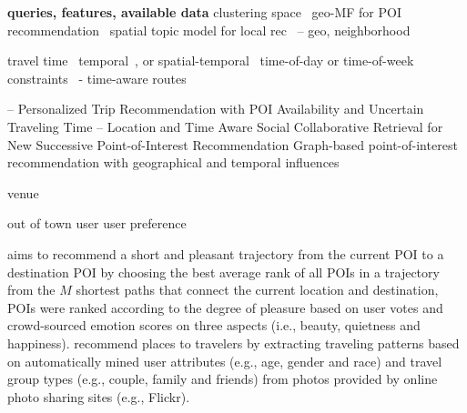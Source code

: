 

{\bf queries, features, available data}
clustering space~\cite{hu2013spatialtopic}
geo-MF for POI recommendation~\cite{lian2014geomf}
spatial topic model for local rec~\cite{hu2013spatialtopic}
\cite{liu2014exploiting} -- geo, neighborhood

travel time~\cite{gao2013temporal}
temporal~\cite{yuan2013timeaware,hsieh2014mining,gao2013temporal}, or spatial-temporal~\cite{yuan2014graph}
time-of-day or time-of-week constraints~\cite{chen2015tripplanner}
\cite{hsieh2014mining} - time-aware routes

\cite{zhang2015personalized} -- Personalized Trip Recommendation with POI Availability and Uncertain Traveling Time
\cite{zhang2015location} -- Location and Time Aware Social Collaborative Retrieval for New Successive Point-of-Interest Recommendation
\cite{yuan2014graph} Graph-based point-of-interest recommendation with geographical and temporal influences

venue\cite{deveaud2014importance,deveaud2015experiments}

out of town user \cite{ference2013location}
user preference\cite{liu2013personalized}

\cite{ht14} aims to recommend a short and pleasant trajectory from the current POI to a destination POI by choosing the best average rank 
of all POIs in a trajectory from the $M$ shortest paths that connect the current location and destination,
POIs were ranked according to the degree of pleasure based on user votes and  crowd-sourced emotion scores on three aspects 
(i.e., beauty, quietness and happiness).
\cite{travel13} recommend places to travelers by extracting traveling patterns based on automatically mined user attributes 
(e.g., age, gender and race) and travel group types (e.g., couple, family and friends) from photos provided by online photo 
sharing sites (e.g., Flickr).

